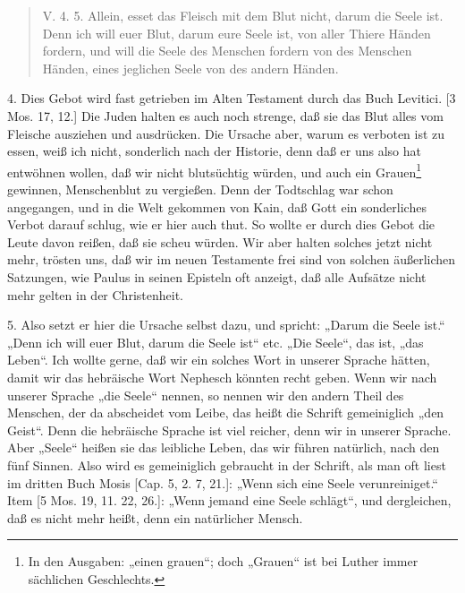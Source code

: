\begin{quote}
V. 4. 5. Allein, esset das Fleisch mit dem Blut nicht, darum die Seele ist. Denn ich will euer Blut, darum eure Seele ist, von aller Thiere Händen fordern, und will die Seele des Menschen fordern von des Menschen Händen, eines jeglichen Seele von des andern Händen.
\end{quote}

4. Dies Gebot wird fast getrieben im Alten Testament durch das Buch Levitici. [3 Mos. 17, 12.] Die Juden halten es auch noch strenge, daß sie das Blut alles vom Fleische ausziehen und ausdrücken. Die Ursache aber, warum es verboten ist zu essen, weiß ich nicht, sonderlich nach der Historie, denn daß er uns also hat entwöhnen wollen, daß wir nicht blutsüchtig würden, und auch ein Grauen\footnote{In den Ausgaben: „einen grauen“; doch „Grauen“ ist bei Luther immer sächlichen Geschlechts.} gewinnen, Menschenblut zu vergießen. Denn der Todtschlag war schon angegangen, und in die Welt gekommen von Kain, daß Gott ein sonderliches Verbot darauf schlug, wie er hier auch thut. So wollte er durch dies Gebot die Leute davon reißen, daß sie scheu würden. Wir aber halten solches jetzt nicht mehr, trösten uns, daß wir im neuen Testamente frei sind von solchen äußerlichen Satzungen, wie Paulus in seinen Episteln oft anzeigt, daß alle Aufsätze nicht mehr gelten in der Christenheit.

5. Also setzt er hier die Ursache selbst dazu, und spricht: „Darum die Seele ist.“ „Denn ich will euer Blut, darum die Seele ist“ etc. „Die Seele“, das ist, „das Leben“. Ich wollte gerne, daß wir ein solches Wort in unserer Sprache hätten, damit wir das hebräische Wort Nephesch könnten recht geben. Wenn wir nach unserer Sprache „die Seele“ nennen, so nennen wir den andern Theil des Menschen, der da abscheidet vom Leibe, das heißt die Schrift gemeiniglich „den Geist“. Denn die hebräische Sprache ist viel reicher, denn wir in unserer Sprache. Aber „Seele“ heißen sie das leibliche Leben, das wir führen natürlich, nach den fünf Sinnen. Also wird es gemeiniglich gebraucht in der Schrift, als man oft liest im dritten Buch Mosis [Cap. 5, 2. 7, 21.]: „Wenn sich eine Seele verunreiniget.“ Item [5 Mos. 19, 11. 22, 26.]: „Wenn jemand eine Seele schlägt“, und dergleichen, daß es nicht mehr heißt, denn ein natürlicher Mensch.

